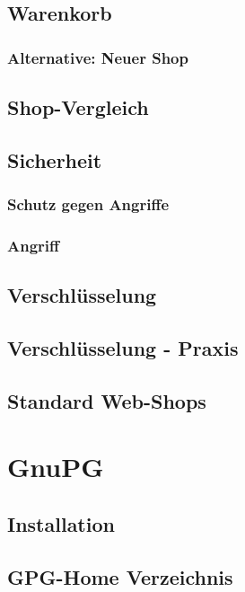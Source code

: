 \subsection{Warenkorb}
\subsubsection*{Alternative: Neuer Shop}

\subsection{Shop-Vergleich}

\subsection{Sicherheit}
\subsubsection*{Schutz gegen Angriffe}
\subsubsection*{Angriff}

\subsection{Verschlüsselung}

\subsection{Verschlüsselung - Praxis}

\subsection{Standard Web-Shops}

\section{GnuPG}

\subsection{Installation}

\subsection{GPG-Home Verzeichnis}


